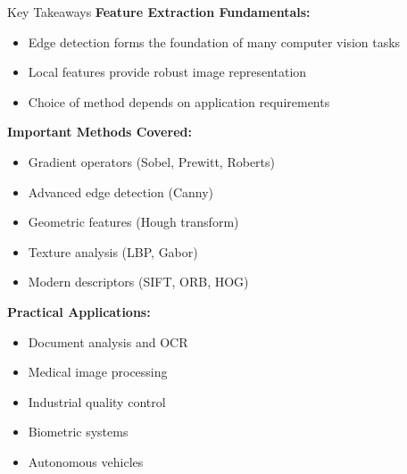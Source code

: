 \documentclass[aspectratio=169,10pt]{beamer}
\begin{document}
\begin{frame}{Key Takeaways}
    \textbf{Feature Extraction Fundamentals:}
    \begin{itemize}
        \item Edge detection forms the foundation of many computer vision tasks
        \item Local features provide robust image representation
        \item Choice of method depends on application requirements
    \end{itemize}

    \textbf{Important Methods Covered:}
    \begin{itemize}
        \item Gradient operators (Sobel, Prewitt, Roberts)
        \item Advanced edge detection (Canny)
        \item Geometric features (Hough transform)
        \item Texture analysis (LBP, Gabor)
        \item Modern descriptors (SIFT, ORB, HOG)
    \end{itemize}

    \textbf{Practical Applications:}
    \begin{itemize}
        \item Document analysis and OCR
        \item Medical image processing
        \item Industrial quality control
        \item Biometric systems
        \item Autonomous vehicles
    \end{itemize}
\end{frame}
\end{document}
